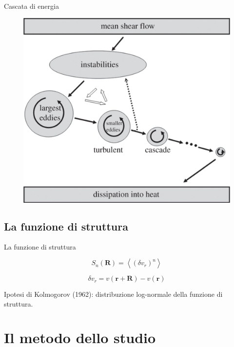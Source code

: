 \documentclass[11pt]{beamer}
\begin{document}
\begin{frame}{Cascata di energia}
\begin{figure}
\centering
\includegraphics[scale=0.65]{large.jpg}
\end{figure}
\end{frame}

\subsection{La funzione di struttura}

\begin{frame}{La funzione di struttura}

\begin{equation}
S_n (\mathbf{R} ) =
\left\langle 
\left(
\delta v_r 
\right)^n
\right\rangle
\end{equation}

\begin{equation}
\delta v_r = v(\mathbf{r} + \mathbf{R}) - v(\mathbf{r})
\end{equation}

Ipotesi di Kolmogorov (1962): distribuzione log-normale della funzione di struttura.
\end{frame}

\section{Il metodo dello studio}
\end{document}
